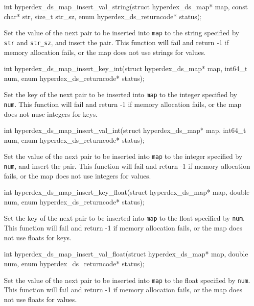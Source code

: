 \funcsep
\begin{ccode}
int hyperdex_ds_map_insert_val_string(struct hyperdex_ds_map* map,
                                      const char* str, size_t str_sz,
                                      enum hyperdex_ds_returncode* status);
\end{ccode}
\funcdesc Set the value of the next pair to be inserted into \texttt{map} to the
string specified by \texttt{str} and \texttt{str\_sz}, and insert the pair.
This function will fail and return -1 if memory allocation fails, or the map
does not use strings for values.

\funcsep
\begin{ccode}
int hyperdex_ds_map_insert_key_int(struct hyperdex_ds_map* map,
                                   int64_t num,
                                   enum hyperdex_ds_returncode* status);
\end{ccode}
\funcdesc Set the key of the next pair to be inserted into \texttt{map} to the
integer specified by \texttt{num}.  This function will fail and return -1 if
memory allocation fails, or the map does not nuse integers for keys.

\funcsep
\begin{ccode}
int hyperdex_ds_map_insert_val_int(struct hyperdex_ds_map* map,
                                   int64_t num,
                                   enum hyperdex_ds_returncode* status);
\end{ccode}
\funcdesc Set the value of the next pair to be inserted into \texttt{map} to the
integer specified by \texttt{num}, and insert the pair.  This function will fail
and return -1 if memory allocation fails, or the map does not use integers for
values.

\funcsep
\begin{ccode}
int hyperdex_ds_map_insert_key_float(struct hyperdex_ds_map* map,
                                     double num,
                                     enum hyperdex_ds_returncode* status);
\end{ccode}
\funcdesc Set the key of the next pair to be inserted into \texttt{map} to the
float specified by \texttt{num}.  This function will fail and return -1 if
memory allocation fails, or the map does not use floats for keys.

\funcsep
\begin{ccode}
int hyperdex_ds_map_insert_val_float(struct hyperdex_ds_map* map,
                                     double num,
                                     enum hyperdex_ds_returncode* status);
\end{ccode}
\funcdesc Set the value of the next pair to be inserted into \texttt{map} to the
float specified by \texttt{num}.  This function will fail and return -1 if
memory allocation fails, or the map does not use floats for values.

